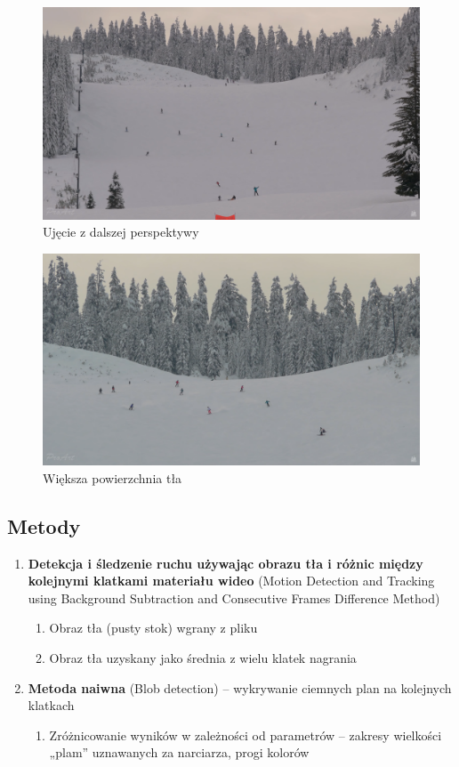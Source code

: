 \documentclass[a4paper]{article}
\begin{document}
\begin{figure}
  \includegraphics[width=\linewidth]{resources/img2.png}
  \caption{Ujęcie z dalszej perspektywy}
\end{figure}
\begin{figure}
  \includegraphics[width=\linewidth]{resources/img3.png}
  \caption{Większa powierzchnia tła}
\end{figure}

\subsection{Metody}
\begin{enumerate}
\item \textbf{Detekcja i śledzenie ruchu używając obrazu tła i różnic między kolejnymi klatkami materiału wideo} (Motion Detection and Tracking using Background Subtraction and Consecutive Frames Difference Method)
	\begin{enumerate}
	\item Obraz tła (pusty stok) wgrany z pliku
	\item Obraz tła uzyskany jako średnia z wielu klatek nagrania
	\end{enumerate}
\item \textbf{Metoda naiwna} (Blob detection) – wykrywanie ciemnych plan na kolejnych klatkach
	\begin{enumerate}
	\item Zróżnicowanie wyników w zależności od parametrów – zakresy wielkości „plam” uznawanych za narciarza, progi kolorów
	\end{enumerate}
\end{enumerate}	
\end{document}

